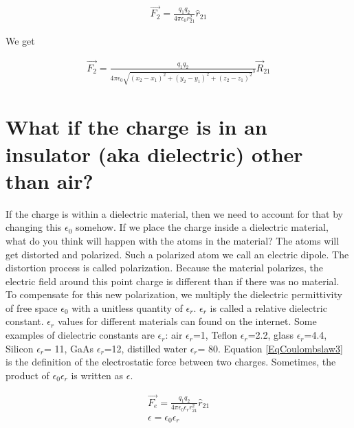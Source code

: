 \documentclass{ximera}
\begin{document}
\begin{example}
\begin{explanation}
\begin{eqnarray}
\vec{F_2}=\frac{q_1 q_2}{4 \pi \epsilon_{0} r_{21}^2} \hat{r}_{21}
\end{eqnarray}

 

 
We get


\begin{eqnarray}
\vec{F_2}=\frac{q_1 q_2}{4 \pi \epsilon_{0} {\sqrt{(x_2 - x_1)^2 +(y_2 - y_1)^2 +(z_2 - z_1)^2}
}^3} \vec{R}_{21} \label{eqonecharge}
\end{eqnarray}







\end{explanation}


\end{example}




\section{What if the charge is in an insulator (aka dielectric) other than air?} 

If the charge is within a dielectric material, then we need to account for that by changing this $\epsilon_0$ somehow. If we place the charge inside a dielectric material, what do you think will happen with the atoms in the material? The atoms will get distorted and polarized. Such a polarized atom we call an electric dipole. The distortion process is called polarization. Because the material polarizes, the electric field around this point charge is different than if there was no material. To compensate for this new polarization, we multiply the dielectric permittivity of free space $\epsilon_0$ with a unitless quantity of $\epsilon_r$.  $\epsilon_r$ is called a relative dielectric constant. $\epsilon_r$ values for different materials can found on the internet. Some examples of dielectric constants are $\epsilon_r$: air $\epsilon_r$=1,  Teflon $\epsilon_r$=2.2, glass $\epsilon_r$=4.4, Silicon $\epsilon_r$= 11, GaAs $\epsilon_r$=12, distilled water $\epsilon_r$= 80.  Equation \ref{EqCoulombslaw3} is the definition of the electrostatic force between two charges. Sometimes, the product of $\epsilon_0 \epsilon_r$ is written as $\epsilon$.

\begin{eqnarray}
\vec{F_e}=\frac{q_1 q_2}{4 \pi \epsilon_0 \epsilon_r r_{21}^2} \hat{r}_{21} \label{EqCoulombslaw3} \\
\epsilon = \epsilon_0 \epsilon_r
\end{eqnarray}
\end{document}
